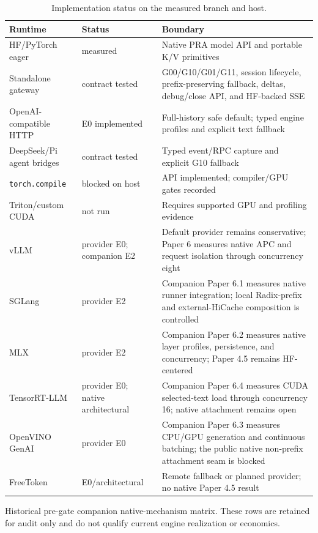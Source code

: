 \documentclass[11pt]{article}
\begin{document}
\begin{table}[H]
\centering
\caption{Implementation status on the measured branch and host.}
\begin{tabularx}{\linewidth}{l l Y}
\toprule
Runtime & Status & Boundary\\
\midrule
HF/PyTorch eager & measured & Native PRA model API and portable K/V primitives\\
Standalone gateway & contract tested & G00/G10/G01/G11, session lifecycle,
prefix-preserving fallback, deltas, debug/close API, and HF-backed SSE\\
OpenAI-compatible HTTP & E0 implemented & Full-history safe default; typed
engine profiles and explicit text fallback\\
DeepSeek/Pi agent bridges & contract tested & Typed event/RPC capture and explicit G10 fallback\\
\texttt{torch.compile} & blocked on host & API implemented; compiler/GPU gates recorded\\
Triton/custom CUDA & not run & Requires supported GPU and profiling evidence\\
vLLM & provider E0; companion E2 & Default provider remains conservative;
Paper 6 measures native APC and request isolation through concurrency eight\\
SGLang & provider E2 & Companion Paper 6.1 measures native runner integration;
local Radix-prefix and external-HiCache composition is controlled\\
MLX & provider E2 & Companion Paper 6.2 measures native layer profiles,
persistence, and concurrency; Paper 4.5 remains HF-centered\\
TensorRT-LLM & provider E0; native architectural & Companion Paper 6.4 measures
CUDA selected-text load through concurrency 16; native attachment remains open\\
OpenVINO GenAI & provider E0 & Companion Paper 6.3 measures CPU/GPU generation
and continuous batching; the public native non-prefix attachment seam is blocked\\
FreeToken & E0/architectural & Remote fallback or planned provider; no native
Paper 4.5 result\\
\bottomrule
\end{tabularx}
\end{table}

\begin{table}[H]
\centering
\scriptsize
\caption{Historical pre-gate companion native-mechanism matrix. These rows are
retained for audit only and do not qualify current engine realization or
economics.}

\label{tab:engine-product-matrix}
\end{table}
\end{document}

